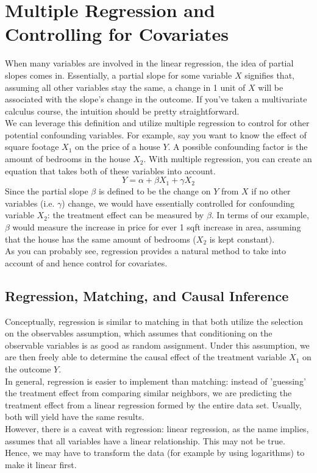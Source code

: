 \documentclass{article}
\begin{document}
\section{Multiple Regression and Controlling for Covariates}
When many variables are involved in the linear regression, the idea of partial slopes comes in.
Essentially, a partial slope for some variable $X$ signifies that, assuming all other variables stay the same, a change in 1 unit of $X$ will be associated with the slope's change in the outcome. 
If you've taken a multivariate calculus course, the intuition should be pretty straightforward.
\\
We can leverage this definition and utilize multiple regression to control for other potential confounding variables.
For example, say you want to know the effect of square footage $X_1$ on the price of a house $Y$. 
A possible confounding factor is the amount of bedrooms in the house $X_2$.
With multiple regression, you can create an equation that takes both of these variables into account. 
$$Y = \alpha + \beta X_1 + \gamma X_2$$
Since the partial slope $\beta$ is defined to be the change on $Y$ from $X$ if no other variables (i.e. $\gamma$) change, we would have essentially controlled for confounding variable $X_2$: the treatment effect can be measured by $\beta$.
In terms of our example, $\beta$ would measure the increase in price for ever 1 sqft increase in area, assuming that the house has the same amount of bedrooms ($X_2$ is kept constant).
\\
As you can probably see, regression provides a natural method to take into account of and hence control for covariates. 

\subsection{Regression, Matching, and Causal Inference}
Conceptually, regression is similar to matching in that both utilize the selection on the observables assumption, which assumes that conditioning on the observable variables is as good as random assignment.
Under this assumption, we are then freely able to determine the causal effect of the treatment variable $X_1$ on the outcome $Y$.
\\
In general, regression is easier to implement than matching: instead of 'guessing' the treatment effect from comparing similar neighbors, we are predicting the treatment effect from a linear regression formed by the entire data set.
Usually, both will yield have the same results. 
\\
However, there is a caveat with regression: linear regression, as the name implies, assumes that all variables have a linear relationship.
This may not be true. 
Hence, we may have to transform the data (for example by using logarithms) to make it linear first. 
\end{document}
